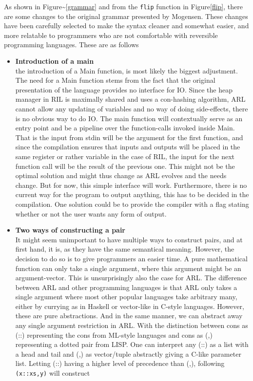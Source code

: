 \documentclass[a4paper]{article}
\begin{document}
As shown in Figure\textasciitilde{}\ref{grammar} and from the \texttt{flip} function in Figure\ref{flip}, there are some changes to the original grammar presented by Mogensen. These changes have been carefully selected to make the syntax cleaner and somewhat easier, and more relatable to programmers who are not comfortable with reversible programming languages. These are as follows
\begin{itemize}
\item \textbf{Introduction of a main}\\
the introduction of a Main function, is most likely the biggest adjustment. The need for a Main function stems from the fact that the original presentation of the language provides no interface for IO. Since the heap manager in RIL is maximally shared and uses a con-hashing algorithm, ARL cannot allow any updating of variables and no way of doing side-effects, there is no obvious way to do IO. The main function will contextually serve as an entry point and be a pipeline over the function-calls invoked inside Main. That is the input from stdin will be the argument for the first function, and since the compilation ensures that inputs and outputs will be placed in the same register or rather variable in the case of RIL, the input for the next function call will be the result of the previous one. This might not be the optimal solution and might thus change as ARL evolves and the needs change. But for now, this simple interface will work. Furthermore, there is no current way for the program to output anything, this has to be decided in the compilation. One solution could be to provide the compiler with a flag stating whether or not the user wants any form of output.
\item \textbf{Two ways of constructing a pair}\\
It might seem unimportant to have multiple ways to construct pairs, and at first hand, it is, as they have the same semantical meaning. However, the decision to do so is to give programmers an easier time. A pure mathematical function can only take a single argument, where this argument might be an argument-vector. This is unsurprisingly also the case for ARL. The difference between ARL and other programming languages is that ARL only takes a single argument where most other popular languages take arbitrary many, either by currying as in Haskell or vector-like in C-style languages. However, these are pure abstractions. And in the same manner, we can abstract away any single argument restriction in ARL. With the distinction between cons as (::) representing the cons from ML-style languages and cons as (,) representing a dotted pair from LISP. One can interpret any (::) as a list with a head and tail and (,) as vector/tuple abstractly giving a C-like parameter list. Letting (::) having a higher level of precedence than (,), following \verb+(x::xs,y)+ will construct


\end{itemize}
\end{document}
